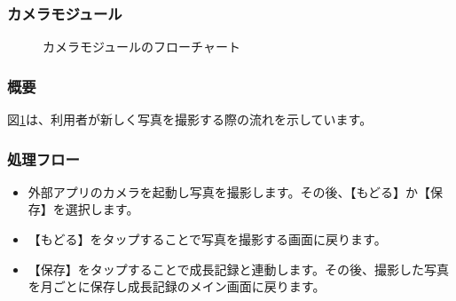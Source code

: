 \documentclass[a4j]{jarticle}
\begin{document}
\subsubsection{カメラモジュール\label{Camera}}
\begin{figure}[H]
    \begin{center}
    \caption {カメラモジュールのフローチャート}
    \label{camera}
    \end{center}
\end{figure}

\subsubsection*{概要}
図\ref{camera}は、利用者が新しく写真を撮影する際の流れを示しています。

\subsubsection*{処理フロー}
\begin{itemize}
\item 外部アプリのカメラを起動し写真を撮影します。その後、【もどる】か【保存】を選択します。
\item 【もどる】をタップすることで写真を撮影する画面に戻ります。
\item 【保存】をタップすることで成長記録と連動します。その後、撮影した写真を月ごとに保存し成長記録のメイン画面に戻ります。
\end{itemize}
\end{document}
